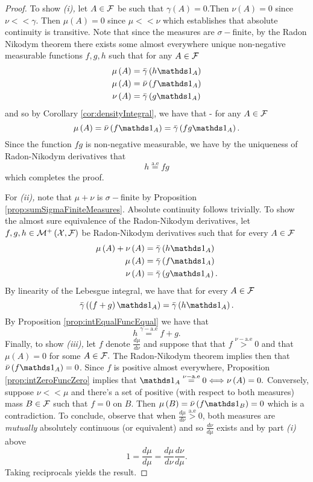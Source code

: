 \begin{proof}
To show \emph{(i),} let $A\in\mathcal{F}$ be such that $\gamma\left(A\right)=0.$Then
$\nu\left(A\right)=0$ since $\nu<<\gamma.$ Then $\mu\left(A\right)=0$
since $\mu<<\nu$ which establishes that absolute continuity is transitive.
Note that since the measures are $\sigma-$finite, by the Radon Nikodym
theorem there exists some almost everywhere unique non-negative measurable
functions $f,g,h$ such that for any $A\in\mathcal{F}$
\begin{align*}
\mu\left(A\right) & =\lebInt{\gamma}{h\indicate_{A}}\\
\mu\left(A\right) & =\lebInt{\nu}{f\indicate_{A}}\\
\nu\left(A\right) & =\lebInt{\gamma}{g\indicate_{A}}
\end{align*}
and so by Corollary \ref{cor:densityIntegral}, we have that - for
any $A\in\mathcal{F}$
\[
\mu\left(A\right)=\lebInt{\nu}{f\indicate_{A}}=\lebInt{\gamma}{fg\indicate_{A}}.
\]
Since the function $fg$ is non-negative measurable, we have by the
uniqueness of Radon-Nikodym derivatives that 
\[
h\stackrel{\text{a.e}}{=}fg
\]
which completes the proof.

For \emph{(ii), }note that $\mu+\nu$ is $\sigma-$finite by Proposition
\ref{prop:sumSigmaFiniteMeasures}. Absolute continuity follows trivially.
To show the almost sure equivalence of the Radon-Nikodym derivatives,
let $f,g,h\in\mathcal{M}^{+}\left(\mathcal{X},\mathcal{F}\right)$ be Radon-Nikodym derivatives
such that for every $A\in\mathcal{F}$
\begin{align*}
\mu\left(A\right)+\nu\left(A\right) & =\lebInt{\gamma}{h\indicate_{A}}\\
\mu\left(A\right) & =\lebInt{\gamma}{f\indicate_{A}}\\
\nu\left(A\right) & =\lebInt{\gamma}{g\indicate_{A}}.
\end{align*}
By linearity of the Lebesgue integral, we have that for every $A\in\mathcal{F}$
\[
\lebInt{\gamma}{\left(f+g\right)\indicate_{A}}=\lebInt{\gamma}{h\indicate_{A}}.
\]
By Proposition \ref{prop:intEqualFuncEqual} we have that 
\[
h\stackrel{\gamma-\text{a.e}}{=}f+g.
\]
Finally, to show \emph{(iii), }let $f$ denote $\frac{d\mu}{d\nu}$
and suppose that that $f\stackrel{\nu-\text{a.e}}{>}0$ and that $\mu\left(A\right)=0$
for some $A\in\mathcal{F}.$ The Radon-Nikodym theorem implies then that $\lebInt{\nu}{f\text{}\indicate_{A}}=0$.
Since $f$ is positive almost everywhere, Proposition \ref{prop:intZeroFuncZero}
implies that $\indicate_{A}\stackrel{\nu-\text{a.e}}{=}0\Longleftrightarrow\nu\left(A\right)=0.$
Conversely, suppose $\nu<<\mu$ and there's a set of positive (with
respect to both measures) mass $B\in\mathcal{F}$ such that $f=0$ on $B$.
Then $\mu\left(B\right)=\lebInt{\nu}{f\indicate_{B}}=0$ which is
a contradiction. To conclude, observe that when $\frac{d\mu}{d\nu}\stackrel{\text{a.e}}{>}0$,
both measures are \emph{mutually }absolutely continuous (or equivalent)
and so $\frac{d\nu}{d\mu}$ exists and by part \emph{(i) }above
\[
1=\frac{d\mu}{d\mu}=\frac{d\mu}{d\nu}\frac{d\nu}{d\mu}.
\]
Taking reciprocals yields the result.
\end{proof}
